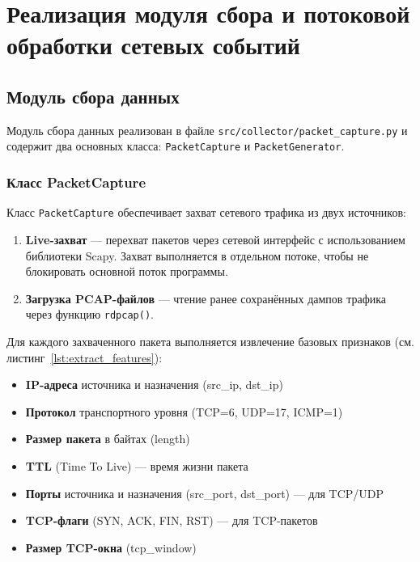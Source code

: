 \chapter{Реализация модуля сбора и потоковой обработки сетевых событий}

\section{Модуль сбора данных}

Модуль сбора данных реализован в файле \texttt{src/collector/packet\_capture.py} и содержит два основных класса: \texttt{PacketCapture} и \texttt{PacketGenerator}.

\subsection{Класс PacketCapture}

Класс \texttt{PacketCapture} обеспечивает захват сетевого трафика из двух источников:

\begin{enumerate}
    \item \textbf{Live-захват} — перехват пакетов через сетевой интерфейс с использованием библиотеки Scapy. Захват выполняется в отдельном потоке, чтобы не блокировать основной поток программы.
    \item \textbf{Загрузка PCAP-файлов} — чтение ранее сохранённых дампов трафика через функцию \texttt{rdpcap()}.
\end{enumerate}

Для каждого захваченного пакета выполняется извлечение базовых признаков (см. листинг~\ref{lst:extract_features}):

\begin{itemize}
    \item \textbf{IP-адреса} источника и назначения (src\_ip, dst\_ip)
    \item \textbf{Протокол} транспортного уровня (TCP=6, UDP=17, ICMP=1)
    \item \textbf{Размер пакета} в байтах (length)
    \item \textbf{TTL} (Time To Live) — время жизни пакета
    \item \textbf{Порты} источника и назначения (src\_port, dst\_port) — для TCP/UDP
    \item \textbf{TCP-флаги} (SYN, ACK, FIN, RST) — для TCP-пакетов
    \item \textbf{Размер TCP-окна} (tcp\_window)
\end{itemize}

